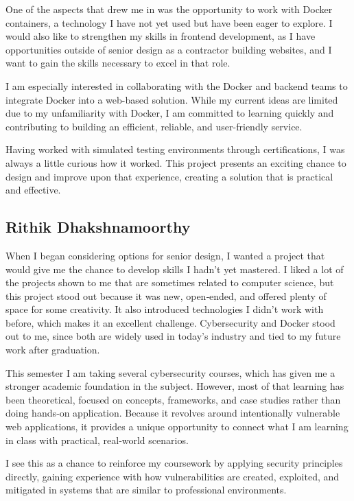 \documentclass[12pt,titlepage]{article}
\begin{document}
One of the aspects that drew me in was the opportunity to work with Docker containers, a technology I have not yet used but have been eager to explore. I would also like to strengthen my skills in frontend development, as I have opportunities outside of senior design as a contractor building websites, and I want to gain the skills necessary to excel in that role.

I am especially interested in collaborating with the Docker and backend teams to integrate Docker into a web-based solution. While my current ideas are limited due to my unfamiliarity with Docker, I am committed to learning quickly and contributing to building an efficient, reliable, and user-friendly service.

Having worked with simulated testing environments through certifications, I was always a little curious how it worked. This project presents an exciting chance to design and improve upon that experience, creating a solution that is practical and effective.

\subsection{Rithik Dhakshnamoorthy}
When I began considering options for senior design, I wanted a project that would give me the chance to develop skills I hadn’t yet mastered. I liked a lot of the projects shown to me that are sometimes related to computer science, but this project stood out because it was new, open‑ended, and offered plenty of space for some creativity. It also introduced technologies I didn’t work with before, which makes it an excellent challenge. Cybersecurity and Docker stood out to me, since both are widely used in today’s industry and tied to my future work after graduation.

This semester I am taking several cybersecurity courses, which has given me a stronger academic foundation in the subject. However, most of that learning has been theoretical, focused on concepts, frameworks, and case studies rather than doing hands‑on application. Because it revolves around intentionally vulnerable web applications, it provides a unique opportunity to connect what I am learning in class with practical, real‑world scenarios.

I see this as a chance to reinforce my coursework by applying security principles directly, gaining experience with how vulnerabilities are created, exploited, and mitigated in systems that are similar to professional environments.
\end{document}

